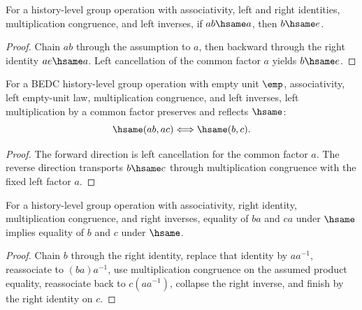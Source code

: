 \begin{theorem}
\label{thm:group-left-absorb-right-factor-unit}
For a history-level group operation with associativity, left and right
identities, multiplication congruence, and left inverses, if $ab\hsame a$,
then $b\hsame e$.
\end{theorem}
\begin{proof}
Chain $ab$ through the assumption to $a$, then backward through the right
identity $ae\hsame a$. Left cancellation of the common factor $a$ yields
$b\hsame e$.
\end{proof}

\begin{theorem}
\label{thm:group-left-mul-cancel-empty-unit-iff}
For a BEDC history-level group operation with empty unit $\emp$,
associativity, left empty-unit law, multiplication congruence, and left
inverses, left multiplication by a common factor preserves and reflects
$\hsame$:
$$
\hsame(ab,ac) \Longleftrightarrow \hsame(b,c).
$$
\end{theorem}
\begin{proof}
The forward direction is left cancellation for the common factor $a$. The
reverse direction transports $b\hsame c$ through multiplication congruence with
the fixed left factor $a$.
\end{proof}

\begin{theorem}
\label{thm:group-right-cancellation}
For a history-level group operation with associativity, right identity,
multiplication congruence, and right inverses, equality of \(ba\) and \(ca\)
under \(\hsame\) implies equality of \(b\) and \(c\) under \(\hsame\).
\end{theorem}
\begin{proof}
Chain \(b\) through the right identity, replace that identity by
\(aa^{-1}\), reassociate to \((ba)a^{-1}\), use multiplication congruence on
the assumed product equality, reassociate back to \(c(aa^{-1})\), collapse the
right inverse, and finish by the right identity on \(c\).
\end{proof}

